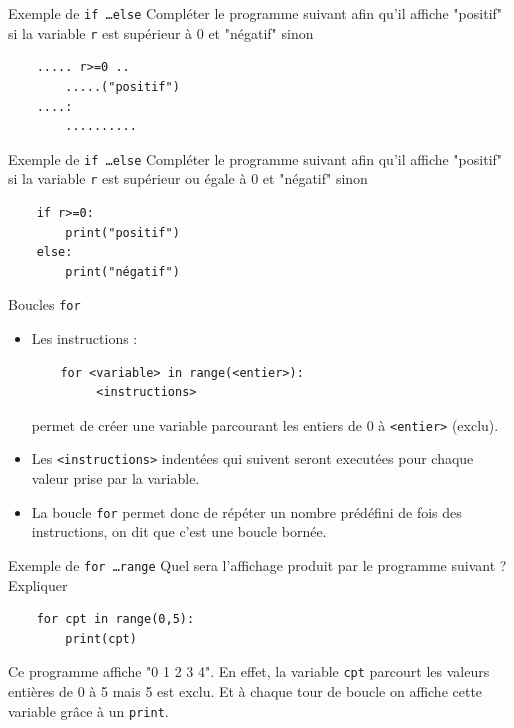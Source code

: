 \documentclass[10pt]{beamer}
\begin{document}
\begin{frame}[fragile]
	\mframe{\Python}
	\begin{exampleblock}{Exemple de {\tt if \dots else}}
		Compléter le programme suivant afin qu'il affiche  "positif" si la variable \texttt{r} est supérieur à 0 et "négatif" sinon
		\begin{lstlisting}
	..... r>=0 ..
		.....("positif")
	....:
		..........
	\end{lstlisting}
	\end{exampleblock}
\end{frame}

\begin{frame}[fragile]
	\mframe{\Python}
	\begin{exampleblock}{Exemple de {\tt if \dots else}}
		Compléter le programme suivant afin qu'il affiche  "positif" si la variable \texttt{r} est supérieur  ou égale à 0 et "négatif" sinon
		\begin{lstlisting}
	if r>=0:
		print("positif")
	else:
		print("négatif")
	\end{lstlisting}
	\end{exampleblock}
\end{frame}




\begin{frame}[fragile]
	\mframe{\Python}
	\begin{alertblock}{Boucles {\tt for}}
		\begin{itemize}
			\item<2-> Les instructions :
			      \begin{lstlisting}
	for <variable> in range(<entier>):
		 <instructions>
	\end{lstlisting}
			      permet de créer une variable parcourant les entiers de 0 à {\tt <entier>} (exclu).
			\item<3-> Les {\tt <instructions>} indentées qui suivent seront executées pour chaque valeur prise par la variable.
			\item<4-> La boucle {\tt for} permet donc de répéter un nombre prédéfini de fois des instructions, on dit que c'est une boucle bornée.
		\end{itemize}
	\end{alertblock}
\end{frame}



\begin{frame}[fragile]
	\mframe{\Python}
	\begin{exampleblock}{Exemple de {\tt for \dots range}}
		Quel sera l'affichage produit par le programme suivant ? Expliquer
		\begin{lstlisting}
	for cpt in range(0,5):
		print(cpt)
	\end{lstlisting}
		 \textcolor{OliveGreen}{Ce programme affiche "0 1 2 3 4". En effet, la variable {\tt cpt} parcourt les valeurs entières de 0 à 5 mais 5 est exclu. Et à chaque tour de boucle on affiche cette variable grâce à un {\tt print}.}
	\end{exampleblock}
\end{frame}
\end{document}
